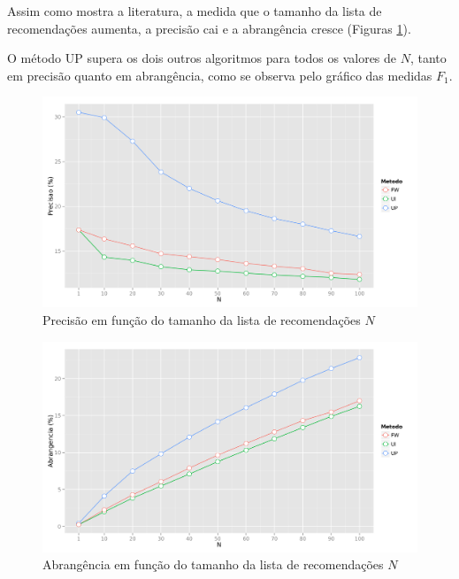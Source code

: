 Assim como mostra a literatura, a medida que o tamanho da lista de recomendações aumenta, a precisão cai e a abrangência cresce (Figuras \ref{fig:precision_N}). 

O método UP supera os dois outros algoritmos para todos os valores de $N$, tanto em precisão quanto em abrangência, como se observa pelo gráfico das medidas $F_1$.

\begin{figure}[htp]
    \begin{center}
    \includegraphics[width=1\textwidth]{img/precision_N}
    \end{center}
    \label{fig:precision_N}
    \caption{Precisão em função do tamanho da lista de recomendações $N$}
\end{figure}


\begin{figure}[htp]
    \begin{center}
    \includegraphics[width=1\textwidth]{img/recall_N}
    \end{center}
    \label{fig:recall_N}
    \caption{Abrangência em função do tamanho da lista de recomendações $N$}
\end{figure}

